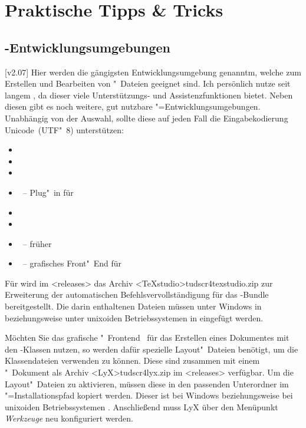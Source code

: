 \chapter{%
  Praktische Tipps \& Tricks%
  \label{sec:tips}%
}
\section{%
  -Entwicklungsumgebungen%
  \label{sec:tips:ide}%
}
%
[v2.07]%
Hier werden die gängigsten Entwicklungsumgebung genanntm, welche zum Erstellen 
und Bearbeiten von "~Dateien geeignet sind. Ich persönlich nutze 
seit langem , da dieser viele Unterstützungs- 
und Assistenzfunktionen bietet. Neben diesen gibt es noch weitere, gut nutzbare 
"=Entwicklungsumgebungen. Unabhängig von der Auswahl, sollte 
diese auf jeden Fall die Eingabekodierung Unicode~(UTF"~8) unterstützen:
%
\begin{itemize}
\item {}
\item {}
\item {}
\item {}~-- Plug"~in für 
\item {}
\item {}
\item {}~-- früher 
\item {}~-- grafisches Front"~End für 
\end{itemize}
%
Für  wird im \GitHubRepo<releases> das Archiv 
\GitHubDownload<TeXstudio>{tudscr4texstudio.zip} zur Erweiterung der 
automatischen Befehlsvervollständigung für das \TUDScript-Bundle 
bereitgestellt. Die darin enthaltenen Dateien müssen unter Windows in 
 beziehungsweise unter unixoiden 
Betriebssystemen in  eingefügt werden.

Möchten Sie das grafische "~Frontend~ 
für das Erstellen eines Dokumentes mit den \TUDScript-Klassen nutzen, so werden 
dafür spezielle Layout"~Dateien benötigt, um die Klassendateien verwenden zu 
können. Diese sind zusammen mit einem "~Dokument als 
Archiv \GitHubDownload<LyX>{tudscr4lyx.zip} im \GitHubRepo<releases> 
verfügbar. Um die Layout"~Dateien zu aktivieren, müssen diese in den passenden 
Unterordner im "=Installationspfad kopiert werden. 
Dieser ist bei Windows
beziehungsweise bei unixoiden Betriebssystemen .
Anschließend muss LyX über den Menüpunkt \emph{Werkzeuge} neu konfiguriert 
werden. 



